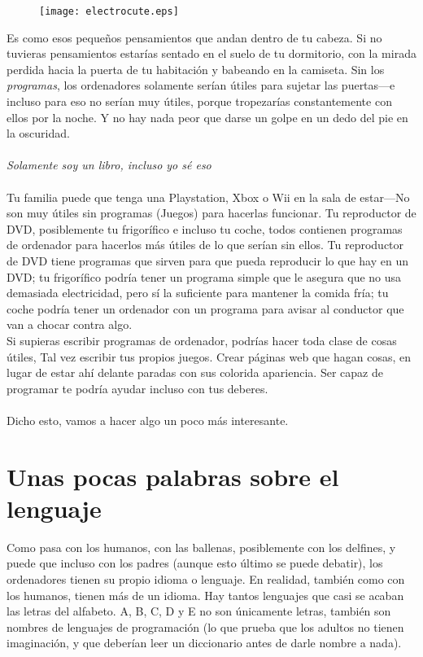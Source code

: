 \begin{figure}
  \begin{center}
\texttt{[image: electrocute.eps]}
  \end{center}
\end{figure}

Es como esos pequeños pensamientos que andan dentro de tu cabeza. Si no tuvieras pensamientos estarías sentado en el suelo de tu dormitorio, con la mirada perdida hacia la puerta de tu habitación y babeando en la camiseta. Sin los \emph{programas}, los ordenadores solamente serían útiles para sujetar las puertas---e incluso para eso no serían muy útiles, porque tropezarías constantemente con ellos por la noche. Y no hay nada peor que darse un golpe en un dedo del pie en la oscuridad.
\\
\\
\emph{Solamente soy un libro, incluso yo sé eso}
\\
\\
Tu familia puede que tenga una Playstation, Xbox o Wii en la sala de estar---No son muy útiles sin programas (Juegos) para hacerlas funcionar. Tu reproductor de DVD, posiblemente tu frigorífico e incluso tu coche, todos contienen programas de ordenador para hacerlos más útiles de lo que serían sin ellos. Tu reproductor de DVD tiene programas que sirven para que pueda reproducir lo que hay en un DVD; tu frigorífico podría tener un programa simple que le asegura que no usa demasiada electricidad, pero sí la suficiente para mantener la comida fría; tu coche podría tener un ordenador con un programa para avisar al conductor que van a chocar contra algo.\\
Si supieras escribir programas de ordenador, podrías hacer toda clase de cosas útiles, Tal vez escribir tus propios juegos. Crear páginas web que hagan cosas, en lugar de estar ahí delante paradas con sus colorida apariencia. Ser capaz de programar te podría ayudar incluso con tus deberes.\\
\\
Dicho esto, vamos a hacer algo un poco más interesante.

\section{Unas pocas palabras sobre el lenguaje}

Como pasa con los humanos, con las ballenas, posiblemente con los delfines, y puede que incluso con los padres (aunque esto último se puede debatir), los ordenadores tienen su propio idioma o lenguaje. En realidad, también como con los humanos, tienen más de un idioma. Hay tantos lenguajes que casi se acaban las letras del alfabeto. A, B, C, D y E no son únicamente letras, también son nombres de lenguajes de programación (lo que prueba que los adultos no tienen imaginación, y que deberían leer un diccionario antes de darle nombre a nada).

